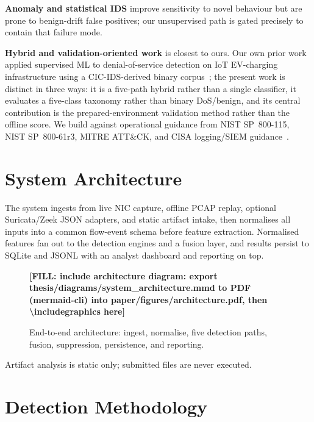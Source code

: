 \documentclass[11pt]{article}
\newcommand{\FILL}[1]{\textbf{[FILL: #1]}}
\begin{document}
\textbf{Anomaly and statistical IDS} improve sensitivity to novel behaviour but
are prone to benign-drift false positives; our unsupervised path is gated
precisely to contain that failure mode.

\textbf{Hybrid and validation-oriented work} is closest to ours. Our own prior
work applied supervised ML to denial-of-service detection on IoT EV-charging
infrastructure using a CIC-IDS-derived binary corpus~\cite{shaik2025ocpp}; the
present work is distinct in three ways: it is a five-path hybrid rather than a
single classifier, it evaluates a five-class taxonomy rather than binary
DoS/benign, and its central contribution is the prepared-environment validation
method rather than the offline score. We build against operational guidance from
NIST SP~800-115, NIST SP~800-61r3, MITRE ATT\&CK, and CISA logging/SIEM
guidance~\cite{nist800115,nist80061,attack,cisalog}.

\section{System Architecture}
\label{sec:arch}

The system ingests from live NIC capture, offline PCAP replay, optional
Suricata/Zeek JSON adapters, and static artifact intake, then normalises all
inputs into a common flow-event schema before feature extraction. Normalised
features fan out to the detection engines and a fusion layer, and results persist
to SQLite and JSONL with an analyst dashboard and reporting on top.

\begin{figure}[h]
\centering
\FILL{include architecture diagram: export thesis/diagrams/system\_architecture.mmd
to PDF (mermaid-cli) into paper/figures/architecture.pdf, then
\textbackslash includegraphics here}
\caption{End-to-end architecture: ingest, normalise, five detection paths,
fusion, suppression, persistence, and reporting.}
\label{fig:arch}
\end{figure}

Artifact analysis is static only; submitted files are never executed.

\section{Detection Methodology}
\label{sec:method}
\end{document}
